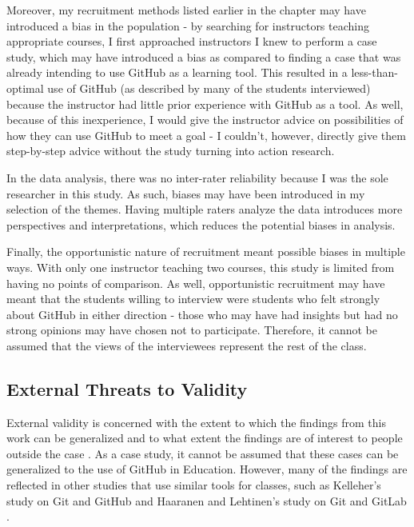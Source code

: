 Moreover, my recruitment methods listed earlier in the chapter may have introduced a bias in the population - by searching for instructors teaching appropriate courses, I first approached instructors I knew to perform a case study, which may have introduced a bias as compared to finding a case that was already intending to use GitHub as a learning tool. This resulted in a less-than-optimal use of GitHub (as described by many of the students interviewed) because the instructor had little prior experience with GitHub as a tool. As well, because of this inexperience, I would give the instructor advice on possibilities of how they can use GitHub to meet a goal - I couldn't, however, directly give them step-by-step advice without the study turning into action research.

In the data analysis, there was no inter-rater reliability because I was the sole researcher in this study. As such, biases may have been introduced in my selection of the themes. Having multiple raters analyze the data introduces more perspectives and interpretations, which reduces the potential biases in analysis.

Finally, the opportunistic nature of recruitment meant possible biases in multiple ways. With only one instructor teaching two courses, this study is limited from having no points of comparison. As well, opportunistic recruitment may have meant that the students willing to interview were students who felt strongly about GitHub in either direction - those who may have had insights but had no strong opinions may have chosen not to participate. Therefore, it cannot be assumed that the views of the interviewees represent the rest of the class.

\subsection{External Threats to Validity}
External validity is concerned with the extent to which the findings from this work can be generalized and to what extent the findings are of interest to people outside the case \cite{runeson2012case}. As a case study, it cannot be assumed that these cases can be generalized to the use of GitHub in Education. However, many of the findings are reflected in other studies that use similar tools for classes, such as Kelleher's study on Git and GitHub \cite{kelleher2014employing} and Haaranen and Lehtinen's study on Git and GitLab \cite{haaranen2015teaching}. %
